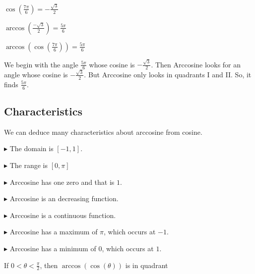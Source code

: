 \documentclass{ximera}
\begin{document}
\begin{example}



$\cos\left(\frac{7\pi}{6}\right) = -\frac{\sqrt{3}}{2}$

$\arccos\left(\frac{-\sqrt{3}}{2}\right) = \frac{5\pi}{6}$


$\arccos\left(\cos\left(\frac{7\pi}{6}\right)\right) = \frac{5\pi}{6}$




We begin with the angle $\frac{5\pi}{6}$ whose cosine is $-\frac{\sqrt{3}}{2}$.  Then Arccosine looks for an angle whose cosine is $-\frac{\sqrt{3}}{2}$.  But Arccosine only looks in quadrants I and II.  So, it finds $\frac{5\pi}{6}$.


\end{example}











\subsection*{Characteristics} 

We can deduce many characteristics about arccosine from cosine.


$\blacktriangleright$ The domain is  $[-1, 1]$.


$\blacktriangleright$ The range is $[0, \pi]$


$\blacktriangleright$ Arccosine has one zero and that is $1$.


$\blacktriangleright$ Arccosine is an decreasing function.

$\blacktriangleright$ Arccosine is a continuous function.

$\blacktriangleright$ Arccosine has a maximum of $\pi$, which occurs at $-1$.

$\blacktriangleright$ Arccosine has a minimum of $0$, which occurs at $1$.








\begin{question}


If $0 < \theta < \frac{\pi}{2}$, then $\arccos(\cos(\theta))$ is in quadrant

\begin{multipleChoice}
\end{multipleChoice}

\end{question}
\end{document}
